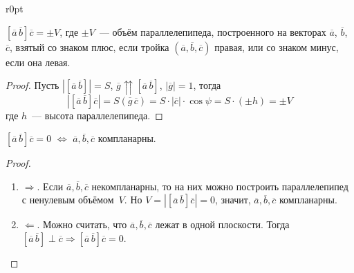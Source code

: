 \begin{wrapfigure}[1]{r}{0pt}\noindent
{}
\end{wrapfigure}
\begin{statement}
$[\overline a\,\overline b] \overline c = \pm V$, где $\pm V$~--- объём параллелепипеда, построенного на векторах $\overline a$, $\overline b$, $\overline c$, взятый со знаком плюс, если тройка $(\overline a, \overline b, \overline c)$ правая, или со знаком минус, если она левая.
\end{statement}
\begin{proof}
Пусть $|[\overline a\,\overline b]| = S$, $\overline g \upuparrows [\overline a\,\overline b]$, $|\overline g| = 1$, тогда
\begin{equation*}
|[\overline a\,\overline b] \overline c| =
S(\overline g\,\overline c) =
S \cdot |\overline c| \cdot \cos \psi =
S \cdot (\pm h) = \pm V
\end{equation*}
где $h$~--- высота параллелепипеда.
\end{proof}

\begin{statement}
$[\overline a\,\overline b] \overline c = 0$ $\Leftrightarrow$ $\overline a, \overline b, \overline c$ компланарны.
\end{statement}
\begin{proof}
\begin{enumerate}
	\item $\Rightarrow$. Если $\overline a, \overline b, \overline c$ некомпланарны, то на них можно построить параллелепипед с ненулевым объёмом~$V$.
	Но $V = |[\overline a\,\overline b] \overline c| = 0$, значит, $\overline a, \overline b, \overline c$ компланарны.
	
	\item $\Leftarrow$. Можно считать, что $\overline a, \overline b, \overline c$ лежат в одной плоскости.
	Тогда $[\overline a\,\overline b] \perp \overline c \Rightarrow
	[\overline a\,\overline b] \overline c = 0$.
\end{enumerate}
\end{proof}

